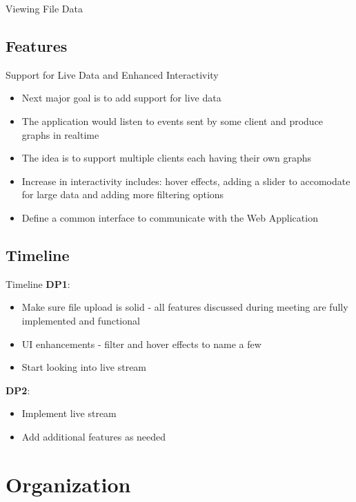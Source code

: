 \documentclass{beamer}
\begin{document}
\begin{frame}{Viewing File Data}
\subsection{Features }
\begin{frame}{Support for Live Data and Enhanced Interactivity}
\begin{itemize}
\item Next major goal is to add support for live data
\item The application would listen to events sent by some client and produce graphs in realtime
\item The idea is to support multiple clients each having their own graphs
\item Increase in interactivity includes: hover effects, adding a slider to accomodate for large data and adding more filtering options
\item Define a common interface to communicate with the Web Application
\end{itemize}
\end{frame}

\subsection{Timeline}
\begin{frame}{Timeline}
\textbf{DP1}:
\begin{itemize}
\item Make sure file upload is solid - all features discussed during meeting are fully implemented and functional
\item UI enhancements - filter and hover effects to name a few
\item Start looking into live stream
\end{itemize}
\textbf{DP2}:
\begin{itemize}
\item Implement live stream
\item Add additional features as needed
\end{itemize}
\end{frame}


\section{Organization}


\end{frame}
\end{document}
